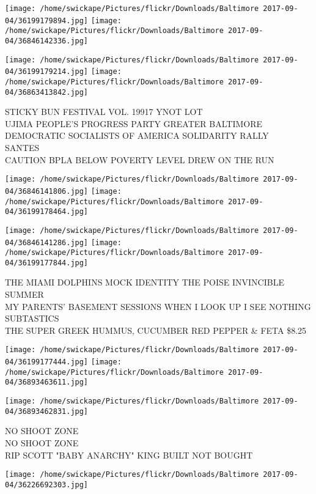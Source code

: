 \documentclass[10pt,letterpaper]{article}
\begin{document}
\texttt{[image: /home/swickape/Pictures/flickr/Downloads/Baltimore 2017-09-04/36199179894.jpg]}
\texttt{[image: /home/swickape/Pictures/flickr/Downloads/Baltimore 2017-09-04/36846142336.jpg]}

\texttt{[image: /home/swickape/Pictures/flickr/Downloads/Baltimore 2017-09-04/36199179214.jpg]}
\texttt{[image: /home/swickape/Pictures/flickr/Downloads/Baltimore 2017-09-04/36863413842.jpg]}

STICKY BUN FESTIVAL VOL. 19917 YNOT LOT\\
UJIMA PEOPLE'S PROGRESS PARTY GREATER BALTIMORE DEMOCRATIC SOCIALISTS OF AMERICA SOLIDARITY RALLY\\
SANTES\\
CAUTION BPLA BELOW POVERTY LEVEL DREW ON THE RUN\\
\pagebreak

\texttt{[image: /home/swickape/Pictures/flickr/Downloads/Baltimore 2017-09-04/36846141806.jpg]}
\texttt{[image: /home/swickape/Pictures/flickr/Downloads/Baltimore 2017-09-04/36199178464.jpg]}

\texttt{[image: /home/swickape/Pictures/flickr/Downloads/Baltimore 2017-09-04/36846141286.jpg]}
\texttt{[image: /home/swickape/Pictures/flickr/Downloads/Baltimore 2017-09-04/36199177844.jpg]}

THE MIAMI DOLPHINS MOCK IDENTITY THE POISE INVINCIBLE SUMMER\\
MY PARENTS' BASEMENT SESSIONS WHEN I LOOK UP I SEE NOTHING\\
SUBTASTICS\\
THE SUPER GREEK HUMMUS, CUCUMBER RED PEPPER \& FETA \$8.25\\
\pagebreak

\texttt{[image: /home/swickape/Pictures/flickr/Downloads/Baltimore 2017-09-04/36199177444.jpg]}
\texttt{[image: /home/swickape/Pictures/flickr/Downloads/Baltimore 2017-09-04/36893463611.jpg]}

\texttt{[image: /home/swickape/Pictures/flickr/Downloads/Baltimore 2017-09-04/36893462831.jpg]}

NO SHOOT ZONE\\
NO SHOOT ZONE\\
RIP SCOTT "BABY ANARCHY" KING BUILT NOT BOUGHT\\
\pagebreak

\texttt{[image: /home/swickape/Pictures/flickr/Downloads/Baltimore 2017-09-04/36226692303.jpg]}
\end{document}
